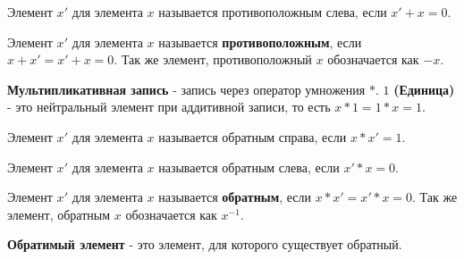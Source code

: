 Элемент $x'$ для элемента $x$ называется противоположным слева, если $x' + x = 0$.

Элемент $x'$ для элемента $x$ называется \textbf{противоположным}, если $x + x' = x' + x = 0$. Так же элемент, противоположный $x$ обозначается как $-x$.


\textbf{Мультипликативная запись} - запись через оператор умножения $\mathbf{*}$. $1$ \textbf{(Единица)} - это нейтральный элемент при аддитивной записи, то есть $x * 1 = 1 * x = 1$. 

Элемент $x'$ для элемента $x$ называется обратным справа, если $x * x' = 1$.

Элемент $x'$ для элемента $x$ называется обратным слева, если $x' * x = 0$.

Элемент $x'$ для элемента $x$ называется \textbf{обратным}, если $x * x' = x' * x = 0$. Так же элемент, обратным $x$ обозначается как $x^{-1}$.

\textbf{Обратимый элемент} - это элемент, для которого существует обратный.






